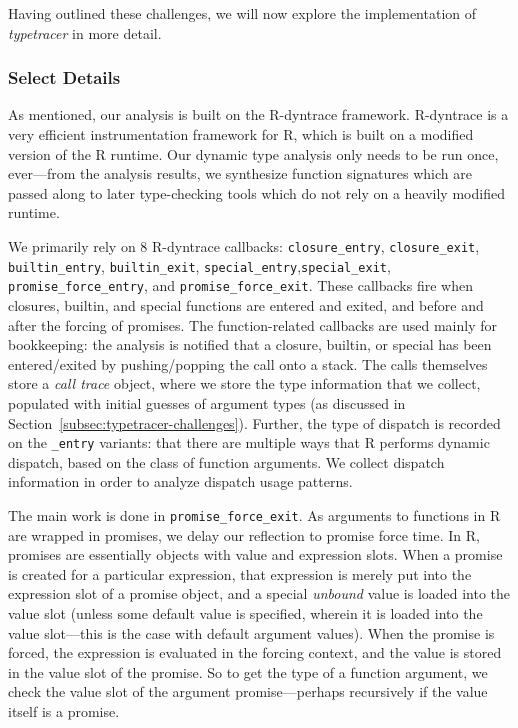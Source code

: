 \documentclass[acmsmall,review,anonymous]{acmart}\settopmatter{printfolios=true,printccs=false,printacmref=false}
\newcommand{\typetracer}{\emph{typetracer}\xspace} %
\begin{document}
\begin{itemize}
\end{itemize}

Having outlined these challenges, we will now explore the implementation of \typetracer in more detail.

%
%
\subsubsection{Select Details}

As mentioned, our analysis is built on the R-dyntrace framework.  R-dyntrace
is a very efficient instrumentation framework for R, which is built on a
modified version of the R runtime.  Our dynamic type analysis only needs to
be run once, ever---from the analysis results, we synthesize function
signatures which are passed along to later type-checking tools which do not
rely on a heavily modified runtime.

We primarily rely on 8 R-dyntrace callbacks: \texttt{closure\_entry},
\texttt{closure\_exit}, \texttt{builtin\_entry}, \texttt{builtin\_exit},
\texttt{special\_entry},\texttt{special\_exit},
\texttt{promise\_force\_entry}, and \texttt{promise\_force\_exit}.  These
callbacks fire when closures, builtin, and special functions are entered and
exited, and before and after the forcing of promises.  The function-related
callbacks are used mainly for bookkeeping: the analysis is notified that a
closure, builtin, or special has been entered/exited by pushing/popping the
call onto a stack.  The calls themselves store a {\it call trace} object,
where we store the type information that we collect, populated with initial
guesses of argument types (as discussed in
Section~\ref{subsec:typetracer-challenges}).  Further, the type of dispatch
is recorded on the {\tt \_entry} variants:  that there are
multiple ways that R performs dynamic dispatch, based on the class of
function arguments.  We collect dispatch information in order to analyze
dispatch usage patterns.

The main work is done in {\tt promise\_force\_exit}.  As arguments to
functions in R are wrapped in promises, we delay our reflection to promise
force time.  In R, promises are essentially objects with value and
expression slots.  When a promise is created for a particular expression,
that expression is merely put into the expression slot of a promise object,
and a special {\it unbound} value is loaded into the value slot (unless some
default value is specified, wherein it is loaded into the value slot---this
is the case with default argument values).  When the promise is forced, the
expression is evaluated in the forcing context, and the value is stored in
the value slot of the promise.  So to get the type of a function argument,
we check the value slot of the argument promise---perhaps recursively if the
value itself is a promise.
\end{document}
